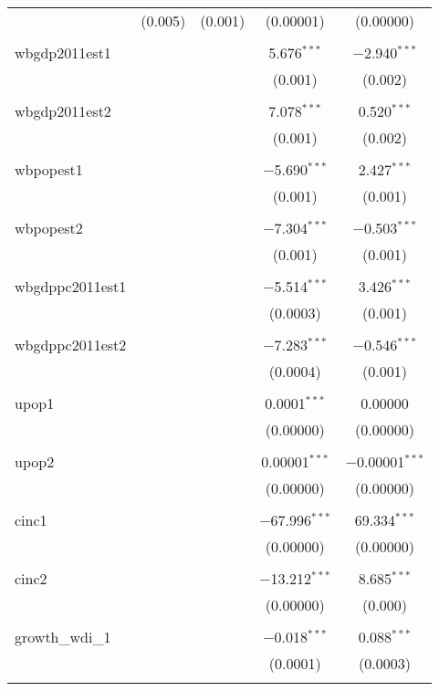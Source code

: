\begin{table}[!htbp]
\begin{tabular}{@{\extracolsep{5pt}}lcccc}
  & (0.005) & (0.001) & (0.00001) & (0.00000) \\ 
  & & & & \\ 
 wbgdp2011est1 &  &  & 5.676$^{***}$ & $-$2.940$^{***}$ \\ 
  &  &  & (0.001) & (0.002) \\ 
  & & & & \\ 
 wbgdp2011est2 &  &  & 7.078$^{***}$ & 0.520$^{***}$ \\ 
  &  &  & (0.001) & (0.002) \\ 
  & & & & \\ 
 wbpopest1 &  &  & $-$5.690$^{***}$ & 2.427$^{***}$ \\ 
  &  &  & (0.001) & (0.001) \\ 
  & & & & \\ 
 wbpopest2 &  &  & $-$7.304$^{***}$ & $-$0.503$^{***}$ \\ 
  &  &  & (0.001) & (0.001) \\ 
  & & & & \\ 
 wbgdppc2011est1 &  &  & $-$5.514$^{***}$ & 3.426$^{***}$ \\ 
  &  &  & (0.0003) & (0.001) \\ 
  & & & & \\ 
 wbgdppc2011est2 &  &  & $-$7.283$^{***}$ & $-$0.546$^{***}$ \\ 
  &  &  & (0.0004) & (0.001) \\ 
  & & & & \\ 
 upop1 &  &  & 0.0001$^{***}$ & 0.00000 \\ 
  &  &  & (0.00000) & (0.00000) \\ 
  & & & & \\ 
 upop2 &  &  & 0.00001$^{***}$ & $-$0.00001$^{***}$ \\ 
  &  &  & (0.00000) & (0.00000) \\ 
  & & & & \\ 
 cinc1 &  &  & $-$67.996$^{***}$ & 69.334$^{***}$ \\ 
  &  &  & (0.00000) & (0.00000) \\ 
  & & & & \\ 
 cinc2 &  &  & $-$13.212$^{***}$ & 8.685$^{***}$ \\ 
  &  &  & (0.00000) & (0.000) \\ 
  & & & & \\ 
 growth\_wdi\_1 &  &  & $-$0.018$^{***}$ & 0.088$^{***}$ \\ 
  &  &  & (0.0001) & (0.0003) \\ 
  & & & & \\ 

\end{tabular}
\end{table}
